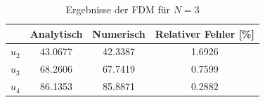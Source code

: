 	\begin{table}[!h]
	\centering
	\caption{Ergebnisse der FDM für $N=3$}
	\begin{tabular}{|c|c|c|c|}
		\hline 
		&  Analytisch & Numerisch & Relativer Fehler [\%] \\ 
		\hline 
		$u_2$ & 43.0677 & 42.3387 & 1.6926 \\ 
		\hline 
		$u_3$ & 68.2606 & 67.7419 & 0.7599 \\ 
		\hline 
		$u_4$ & 86.1353 & 85.8871 & 0.2882 \\ 
		\hline 
	\end{tabular} 

  



	
	\end{table}